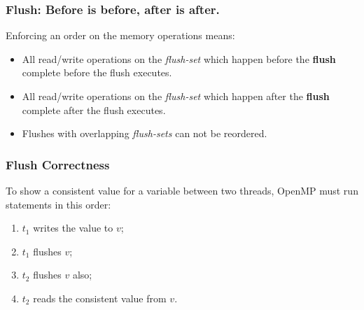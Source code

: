 \begin{frame}
  \frametitle{Flush: Before is before, after is after.}

  
\large
  \begin{changemargin}{.5cm}
  Enforcing an order on the memory operations means:

  \begin{itemize}
    \item All read/write operations on the {\it flush-set} which happen
      before the {\bf flush} complete before the flush executes.
    \item All read/write operations on the {\it flush-set} which happen
      after the {\bf flush} complete after the flush executes.
    \item Flushes with overlapping {\it flush-sets} can not be reordered.
  \end{itemize}
  \end{changemargin}
  
\end{frame}

\begin{frame}
  \frametitle{Flush Correctness}

\Large
  \begin{changemargin}{1cm}
  
  To show a consistent value for a variable between two threads, 
  OpenMP must run statements in this order:

  \begin{enumerate}
    \item $t_1$ writes the value to $v$;
    \item $t_1$ flushes $v$; 
    \item $t_2$ flushes $v$ also;
    \item $t_2$ reads the consistent value from $v$.
  \end{enumerate}
  \end{changemargin}
\end{frame}

